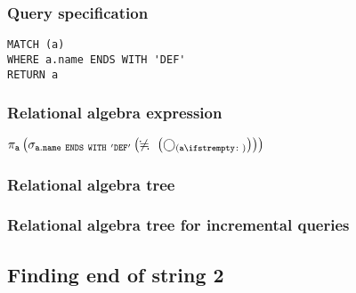 \subsubsection*{Query specification}

\begin{lstlisting}
MATCH (a)
WHERE a.name ENDS WITH 'DEF'
RETURN a
\end{lstlisting}

\subsubsection*{Relational algebra expression}

$\projection{\var{a}} \left(\selection{\mathtt{a.name~ENDS~WITH~'DEF'}} \left(\alldifferent{} \left(\getvertices{a}{}\right)\right)\right)$

\subsubsection*{Relational algebra tree}


\subsubsection*{Relational algebra tree for incremental queries}


\subsection{Finding end of string 2}

